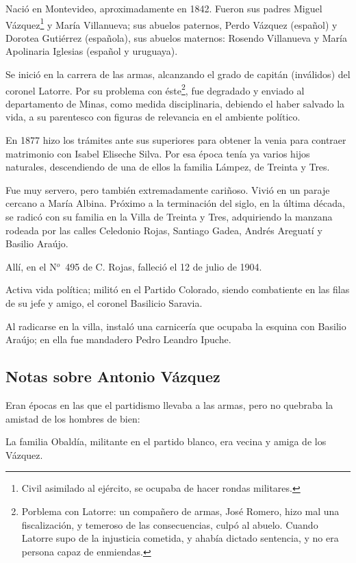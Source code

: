 \documentclass[a4paper]{article}
\begin{document}
Nació en Montevideo, aproximadamente en 1842. Fueron sus padres Miguel Vázquez\footnote{Civil asimilado al ejército, se ocupaba de hacer rondas militares.} y María Villanueva; sus abuelos paternos, Perdo Vázquez (español) y Dorotea Gutiérrez (española), sus abuelos maternos: Rosendo Villanueva y María Apolinaria Iglesias (español y uruguaya).

Se inició en la carrera de las armas, alcanzando el grado de capitán (inválidos) del coronel Latorre. Por su problema con éste\footnote{Porblema con Latorre: un compañero de armas, José Romero, hizo mal una fiscalización, y temeroso de las consecuencias, culpó al abuelo. Cuando Latorre supo de la injusticia cometida, y ahabía dictado sentencia, y no era persona capaz de enmiendas.}, fue degradado y enviado al departamento de Minas, como medida disciplinaria, debiendo el haber salvado la vida, a su parentesco con figuras de relevancia en el ambiente político.

\bigbreak{}

En 1877 hizo los trámites ante sus superiores para obtener la venia para contraer matrimonio con Isabel Eliseche Silva. Por esa época tenía ya varios hijos naturales, descendiendo de una de ellos la familia Lámpez, de Treinta y Tres.

Fue muy servero, pero también extremadamente cariñoso. Vivió en un paraje cercano a María Albina. Próximo a la terminación del siglo, en la última década, se radicó con su familia en la Villa de Treinta y Tres, adquiriendo la manzana rodeada por las calles Celedonio Rojas, Santiago Gadea, Andrés Areguatí y Basilio Araújo.

Allí, en el N$^o$~495 de C. Rojas, falleció el 12 de julio de 1904.

Activa vida política; militó en el Partido Colorado, siendo combatiente en las filas de su jefe y amigo, el coronel Basilicio Saravia.

Al radicarse en la villa, instaló una carnicería que ocupaba la esquina con Basilio Araújo; en ella fue mandadero Pedro Leandro Ipuche.

\subsection{Notas sobre Antonio Vázquez}

Eran épocas en las que el partidismo llevaba a las armas, pero no quebraba la amistad de los hombres de bien:

La familia Obaldía, militante en el partido blanco, era vecina y amiga de los Vázquez.
\end{document}
